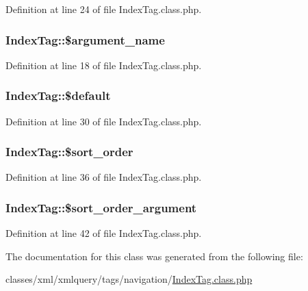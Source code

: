 Definition at line 24 of file Index\+Tag.\+class.\+php.

\hypertarget{classIndexTag_a92f6892b11fed081293fdaabb58f36a0}{
\subsubsection[{\$argument\+\_\+name}]{\setlength{\rightskip}{0pt plus 5cm}Index\+Tag\+::\$argument\+\_\+name}}\label{classIndexTag_a92f6892b11fed081293fdaabb58f36a0}


Definition at line 18 of file Index\+Tag.\+class.\+php.

\hypertarget{classIndexTag_ae24a36bb56ebc33a9161a64b12f92f18}{
\subsubsection[{\$default}]{\setlength{\rightskip}{0pt plus 5cm}Index\+Tag\+::\$default}}\label{classIndexTag_ae24a36bb56ebc33a9161a64b12f92f18}


Definition at line 30 of file Index\+Tag.\+class.\+php.

\hypertarget{classIndexTag_a68336fd5e6a3fa09e2659359cce027fb}{
\subsubsection[{\$sort\+\_\+order}]{\setlength{\rightskip}{0pt plus 5cm}Index\+Tag\+::\$sort\+\_\+order}}\label{classIndexTag_a68336fd5e6a3fa09e2659359cce027fb}


Definition at line 36 of file Index\+Tag.\+class.\+php.

\hypertarget{classIndexTag_af25bb5754a767188b72ee872e35414e6}{
\subsubsection[{\$sort\+\_\+order\+\_\+argument}]{\setlength{\rightskip}{0pt plus 5cm}Index\+Tag\+::\$sort\+\_\+order\+\_\+argument}}\label{classIndexTag_af25bb5754a767188b72ee872e35414e6}


Definition at line 42 of file Index\+Tag.\+class.\+php.



The documentation for this class was generated from the following file\+:\begin{DoxyCompactItemize}
\item 
classes/xml/xmlquery/tags/navigation/\hyperlink{IndexTag_8class_8php}{Index\+Tag.\+class.\+php}\end{DoxyCompactItemize}
